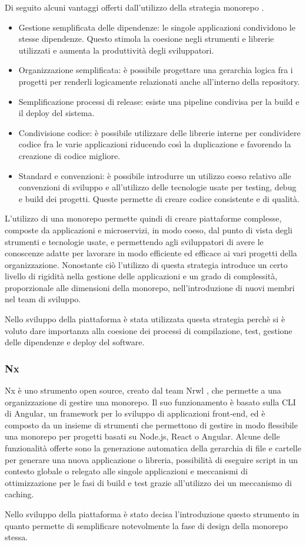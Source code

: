 Di seguito alcuni vantaggi offerti dall'utilizzo della strategia monorepo \cite{Monorepo}.
\begin{itemize}
      \itemsep0em
      \item Gestione semplificata delle dipendenze: le singole applicazioni condividono le stesse dipendenze.
            Questo stimola la coesione negli strumenti e librerie utilizzati e
            aumenta la produttività degli sviluppatori.
      \item Organizzazione semplificata: è possibile progettare una
            gerarchia logica fra i progetti per renderli logicamente
            relazionati anche all'interno della repository.
      \item Semplificazione processi di release: esiste una pipeline condivisa per la build e il deploy del sistema.
      \item Condivisione codice: è possibile utilizzare delle librerie interne per condividere codice fra le varie applicazioni riducendo
            così la duplicazione e favorendo la creazione di codice migliore.
      \item Standard e convenzioni: è possibile introdurre un utilizzo coeso relativo alle convenzioni di sviluppo e all'utilizzo delle tecnologie
            usate per testing, debug e build dei progetti. Queste permette di creare codice consistente e di qualità.

\end{itemize}
L'utilizzo di una monorepo permette quindi di creare piattaforme complesse, composte da applicazioni e microservizi, in modo
coeso, dal punto di vista degli strumenti e tecnologie usate, e permettendo agli sviluppatori di avere le conoscenze adatte per lavorare
in modo efficiente ed efficace ai vari progetti della organizzazione.
Nonostante ciò l'utilizzo di questa strategia introduce un certo livello di rigidità nella gestione delle applicazioni e un
grado di complessità, proporzionale alle dimensioni della monorepo, nell'introduzione di nuovi membri nel team di sviluppo.

Nello sviluppo della piattaforma è stata utilizzata questa strategia perchè
si è voluto dare importanza alla coesione dei processi di compilazione, test, gestione delle dipendenze
e deploy del software.

\subsubsection{Nx}
Nx \cite{Nx} è uno strumento open source, creato dal team Nrwl \cite{Nrwl}, che permette a una organizzazione
di gestire una monorepo.
Il suo funzionamento è basato sulla CLI di Angular, un framework per lo sviluppo di applicazioni front-end,
ed è composto da un insieme di strumenti che permettono di gestire in modo flessibile una monorepo per progetti basati
su Node.js, React o Angular. Alcune delle funzionalità offerte sono la generazione automatica della gerarchia di file e cartelle
per generare una nuova applicazione o libreria, possibilità di eseguire script in un contesto globale o relegato alle singole applicazioni
e meccanismi di ottimizzazione per le fasi di build e test grazie all'utilizzo dei un meccanismo di caching.

Nello sviluppo della piattaforma è stato decisa l'introduzione questo strumento in quanto permette di semplificare
notevolmente la fase di design della monorepo stessa.